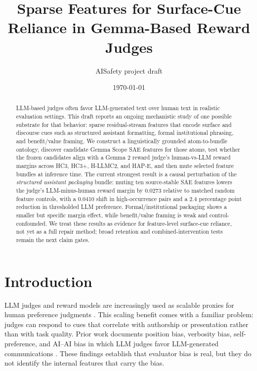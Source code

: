 \documentclass[11pt]{article}
\title{Sparse Features for Surface-Cue Reliance in Gemma-Based Reward Judges}
\author{AISafety project draft}
\date{\today}
\begin{document}
\maketitle

\begin{abstract}
LLM-based judges often favor LLM-generated text over human text in realistic
evaluation settings. This draft reports an ongoing mechanistic study of one
possible substrate for that behavior: sparse residual-stream features that
encode surface and discourse cues such as structured assistant formatting,
formal institutional phrasing, and benefit/value framing. We construct a
linguistically grounded atom-to-bundle ontology, discover candidate Gemma Scope
SAE features for those atoms, test whether the frozen candidates align with a
Gemma 2 reward judge's human-vs-LLM reward margins across HC3, HC3+, H-LLMC2,
and HAP-E, and then mute selected feature bundles at inference time. The
current strongest result is a causal perturbation of the
\emph{structured assistant packaging} bundle: muting ten source-stable SAE
features lowers the judge's LLM-minus-human reward margin by 0.0273 relative
to matched random feature controls, with a 0.0410 shift in high-occurrence
pairs and a 2.4 percentage point reduction in thresholded LLM preference.
Formal/institutional packaging shows a smaller but specific margin effect,
while benefit/value framing is weak and control-confounded. We treat these
results as evidence for feature-level surface-cue reliance, not yet as a full
repair method; broad retention and combined-intervention tests remain the next
claim gates.
\end{abstract}

\section{Introduction}

LLM judges and reward models are increasingly used as scalable proxies for
human preference judgments \citep{zheng2023mtbench}. This scaling benefit comes
with a familiar problem: judges can respond to cues that correlate with
authorship or presentation rather than with task quality. Prior work documents
position bias, verbosity bias, self-preference, and AI--AI bias in which LLM
judges favor LLM-generated communications \citep{laurito2025aiaibias,
panickssery2024selfrecognition,lee2024remodetect}. These findings establish
that evaluator bias is real, but they do not identify the internal features
that carry the bias.
\end{document}
